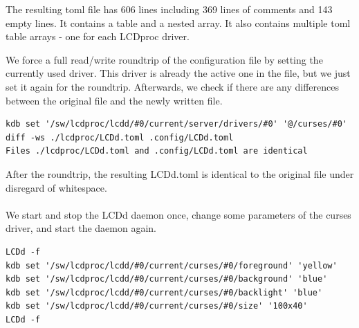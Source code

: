 \documentclass[draft,final]{vutinfth} %
\begin{document}
The resulting \acrshort{toml} file has 606 lines including 369 lines of comments and 143 empty lines.
It contains a table and a nested array.
It also contains multiple \acrshort{toml} table arrays - one for each LCDproc driver.

We force a full read/write roundtrip of the configuration file by setting the currently used driver. This driver is already the active one in the file, but we just set it again for the roundtrip.
Afterwards, we check if there are any differences between the original file and the newly written file.

\begin{Verbatim}[frame=single, fontsize=\small]
kdb set '/sw/lcdproc/lcdd/#0/current/server/drivers/#0' '@/curses/#0'
diff -ws ./lcdproc/LCDd.toml .config/LCDd.toml
Files ./lcdproc/LCDd.toml and .config/LCDd.toml are identical
\end{Verbatim}

After the roundtrip, the resulting LCDd.toml is identical to the original file under disregard of whitespace.
\\\\
We start and stop the LCDd daemon once, change some parameters of the curses driver, and start the daemon again.
\begin{Verbatim}[frame=single, fontsize=\small]
LCDd -f
kdb set '/sw/lcdproc/lcdd/#0/current/curses/#0/foreground' 'yellow'
kdb set '/sw/lcdproc/lcdd/#0/current/curses/#0/background' 'blue'
kdb set '/sw/lcdproc/lcdd/#0/current/curses/#0/backlight' 'blue'
kdb set '/sw/lcdproc/lcdd/#0/current/curses/#0/size' '100x40'
LCDd -f
\end{Verbatim}
\end{document}
